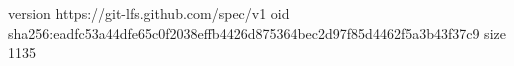 version https://git-lfs.github.com/spec/v1
oid sha256:eadfc53a44dfe65c0f2038effb4426d875364bec2d97f85d4462f5a3b43f37c9
size 1135

